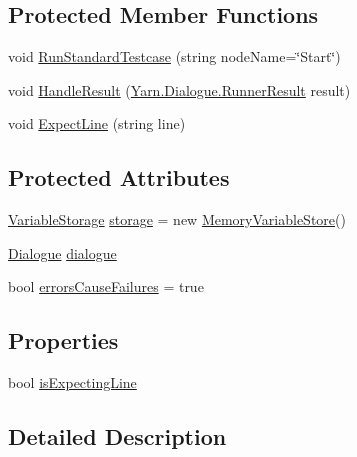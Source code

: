 \subsection*{Protected Member Functions}
\begin{DoxyCompactItemize}
\item 
void \hyperlink{a00146_abffa134d40d72b21e6b35c3bf05fc53f}{Run\-Standard\-Testcase} (string node\-Name=\char`\"{}Start\char`\"{})
\item 
void \hyperlink{a00146_a7b525f85a26d7c942e1cbfa5d6453893}{Handle\-Result} (\hyperlink{a00132}{Yarn.\-Dialogue.\-Runner\-Result} result)
\item 
void \hyperlink{a00146_ac21a5082ddac1da9db17ae54038df44e}{Expect\-Line} (string line)
\end{DoxyCompactItemize}
\subsection*{Protected Attributes}
\begin{DoxyCompactItemize}
\item 
\hyperlink{a00166}{Variable\-Storage} \hyperlink{a00146_a23d59ace1516ca72924c6fe3feafd3f7}{storage} = new \hyperlink{a00110}{Memory\-Variable\-Store}()
\item 
\hyperlink{a00072}{Dialogue} \hyperlink{a00146_a4cff5de56c4b8a91c76b6eb2d622a795}{dialogue}
\item 
bool \hyperlink{a00146_ac978fe85db843c51411f5517bdbe0eb8}{errors\-Cause\-Failures} = true
\end{DoxyCompactItemize}
\subsection*{Properties}
\begin{DoxyCompactItemize}
\item 
bool \hyperlink{a00146_a47f35b8e8123ed9471883d02b8bc9f3e}{is\-Expecting\-Line}
\end{DoxyCompactItemize}


\subsection{Detailed Description}


